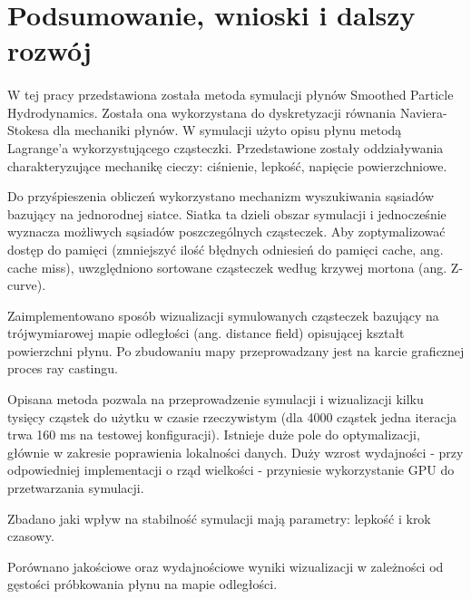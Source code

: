 \newpage

\section{Podsumowanie, wnioski i dalszy rozwój}

\paragraph{}
W tej pracy przedstawiona została metoda symulacji płynów Smoothed Particle Hydrodynamics. Została ona wykorzystana do dyskretyzacji równania Naviera-Stokesa dla mechaniki płynów. W symulacji użyto opisu płynu metodą Lagrange'a wykorzystującego cząsteczki. Przedstawione zostały oddziaływania charakteryzujące mechanikę cieczy: ciśnienie, lepkość, napięcie powierzchniowe.
\par
Do przyśpieszenia obliczeń wykorzystano mechanizm wyszukiwania sąsiadów bazujący na jednorodnej siatce. Siatka ta dzieli obszar symulacji i jednocześnie wyznacza możliwych sąsiadów poszczególnych cząsteczek. Aby zoptymalizować dostęp do pamięci (zmniejszyć ilość błędnych odniesień do pamięci cache, ang. cache miss), uwzględniono sortowane cząsteczek według krzywej mortona (ang. Z-curve).
\par
Zaimplementowano sposób wizualizacji symulowanych cząsteczek bazujący na trójwymiarowej mapie odległości (ang. distance field) opisującej kształt powierzchni płynu. Po zbudowaniu mapy przeprowadzany jest na karcie graficznej proces ray castingu.
\par
Opisana metoda pozwala na przeprowadzenie symulacji i wizualizacji kilku tysięcy cząstek do użytku w czasie rzeczywistym (dla 4000 cząstek jedna iteracja trwa 160 ms na testowej konfiguracji). Istnieje duże pole do optymalizacji, głównie w zakresie poprawienia lokalności danych. Duży wzrost wydajności - przy odpowiedniej implementacji o rząd wielkości - przyniesie wykorzystanie GPU do przetwarzania symulacji.
\par
Zbadano jaki wpływ na stabilność symulacji mają parametry: lepkość i krok czasowy.
\par
Porównano jakościowe oraz wydajnościowe wyniki wizualizacji w zależności od gęstości próbkowania płynu na mapie odległości.
\par
